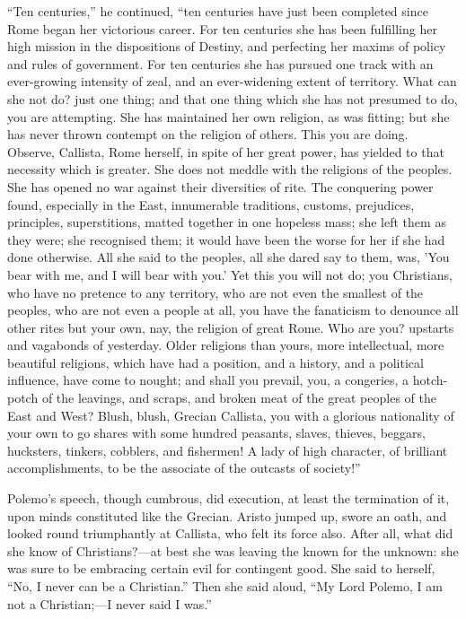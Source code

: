 ``Ten centuries,'' he continued, ``ten centuries have
just been completed since Rome began her victorious career. For ten
centuries she has been fulfilling her high mission in the dispositions
of Destiny, and perfecting her maxims of policy and rules of
government. For ten centuries she has pursued one track with an
ever-growing intensity of zeal, and an ever-widening extent of
territory. What can she not do? just one thing; and that one thing
which she has not presumed to do, you are attempting. She has
maintained her own religion, as was fitting; but she has never thrown
contempt on the religion of others. This you are doing. Observe,
Callista, Rome herself, in spite of her great power, has yielded to
that necessity which is greater. She does not meddle with the
religions of the peoples. She has opened no war against their
diversities of rite. The conquering power found, especially in the
East, innumerable traditions, customs, prejudices, principles,
superstitions, matted together in one hopeless mass; she left them as
they were; she recognised them; it would have been the worse for her
if she had done otherwise. All she said to the peoples, all she
dared say to them, was, 'You bear with me, and I will bear with you.'
Yet this you will not do; you Christians, who have no pretence to any
territory, who are not even the smallest of the peoples, who are not
even a people at all, you have the fanaticism to denounce all other
rites but your own, nay, the religion of great Rome. Who are you?
upstarts and vagabonds of yesterday. Older religions than yours, more
intellectual, more beautiful religions, which have had a position, and
a history, and a political influence, have come to nought; and shall
you prevail, you, a congeries, a hotch-potch of the leavings, and
scraps, and broken meat of the great peoples of the East and West?
Blush, blush, Grecian Callista, you with a glorious nationality of
your own to go shares with some hundred peasants, slaves, thieves,
beggars, hucksters, tinkers, cobblers, and fishermen! A lady of high
character, of brilliant accomplishments, to be the associate of the
outcasts of society!''

Polemo's speech, though cumbrous, did execution, at least the
termination of it, upon minds constituted like the Grecian. Aristo
jumped up, swore an oath, and looked round triumphantly at Callista,
who felt its force also. After all, what did she know of Christians?—at
best she was leaving the known for the unknown: she was sure to be
embracing certain evil for contingent good. She said to herself,
``No, I never can be a Christian.'' Then she said aloud,
``My Lord Polemo, I am not a Christian;—I never said I
was.''

